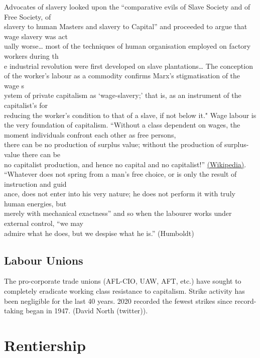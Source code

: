\documentclass[
]{book}
\begin{document}
Advocates of slavery looked upon the ``comparative evils of Slave Society and of Free Society, of\\
slavery to human Masters and slavery to Capital'' and proceeded to argue that wage slavery was act\\
ually worse\ldots{} most of the techniques of human organisation employed on factory workers during th\\
e industrial revolution were first developed on slave plantations\ldots{}
The conception of the worker's labour as a commodity confirms Marx's stigmatisation of the wage s\\
ystem of private capitalism as `wage-slavery;' that is, as an instrument of the capitalist's for\\
reducing the worker's condition to that of a slave, if not below it."
Wage labour is the very foundation of capitalism.
``Without a class dependent on wages, the moment individuals confront each other as free persons,\\
there can be no production of surplus value; without the production of surplus-value there can be\\
no capitalist production, and hence no capital and no capitalist!''
\href{https://en.wikipedia.org/wiki/Wage_labour}{(Wikipedia)}.
``Whatever does not spring from a man's free choice, or is only the result of instruction and guid\\
ance, does not enter into his very nature; he does not perform it with truly human energies, but\\
merely with mechanical exactness'' and so when the labourer works under external control, ``we may\\
admire what he does, but we despise what he is.'' (Humboldt)

\hypertarget{labour-unions}{%
\subsection{Labour Unions}\label{labour-unions}}

The pro-corporate trade unions (AFL-CIO, UAW, AFT, etc.) have sought to completely eradicate working class resistance to capitalism.
Strike activity has been negligible for the last 40 years. 2020 recorded the fewest strikes since record-taking began in 1947. (David North (twitter)).

\hypertarget{rentiership}{%
\section{Rentiership}\label{rentiership}}
\end{document}
